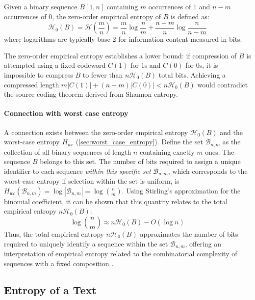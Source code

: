 \begin{definition}
    Given a binary sequence $B[1, n]$ containing $m$ occurrences of $1$ and $n-m$ occurrences of $0$, the zero-order empirical entropy of $B$ is defined as:
    \begin{equation*}
        \mathcal{H}_0(B) = \mathcal{H} \left( \frac{m}{n} \right) = \frac{m}{n} \log \frac{n}{m} + \frac{n-m}{n} \log \frac{n}{n-m}
    \end{equation*}
    where logarithms are typically base 2 for information content measured in bits.
\end{definition}
The zero-order empirical entropy establishes a lower bound: if compression of $B$ is attempted using a fixed codeword $C(1)$ for $1$s and $C(0)$ for $0$s, it is impossible to compress $B$ to fewer than $n \mathcal{H}_0(B)$ total bits. Achieving a compressed length $m |C(1)| + (n-m) |C(0)| < n \mathcal{H}_0(B)$ would contradict the source coding theorem derived from Shannon entropy.

\paragraph{Connection with worst case entropy}
A connection exists between the zero-order empirical entropy $\mathcal{H}_0(B)$ and the worst-case entropy $H_{wc}$ (\autoref{sec:worst_case_entropy}). Define the set $\mathcal{B}_{n,m}$ as the collection of all binary sequences of length $n$ containing exactly $m$ ones. The sequence $B$ belongs to this set. The number of bits required to assign a unique identifier to each sequence \emph{within this specific set} $\mathcal{B}_{n,m}$, which corresponds to the worst-case entropy if selection within the set is uniform, is $H_{wc}(\mathcal{B}_{n,m}) = \log |\mathcal{B}_{n,m}| = \log \binom{n}{m}$. Using Stirling's approximation for the binomial coefficient, it can be shown that this quantity relates to the total empirical entropy $n \mathcal{H}_0(B)$:
\[ \log \binom{n}{m} \approx n \mathcal{H}_0(B) - O(\log n) \]
Thus, the total empirical entropy $n \mathcal{H}_0(B)$ approximates the number of bits required to uniquely identify a sequence within the set $\mathcal{B}_{n,m}$, offering an interpretation of empirical entropy related to the combinatorial complexity of sequences with a fixed composition \cite{navarro2016compact}.

\subsection{Entropy of a Text}

